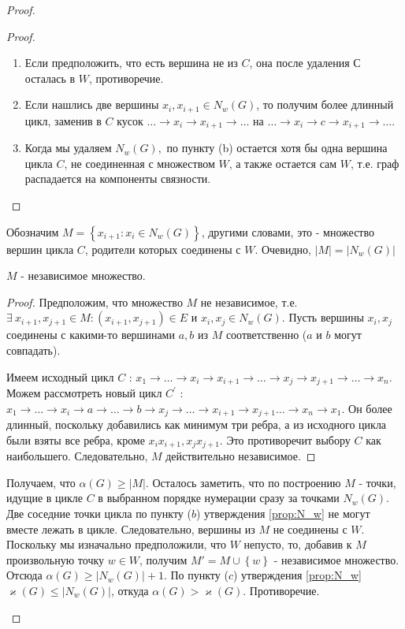 \begin{proof}
\begin{enumerate}
\begin{prop}
		\end{prop}
		
		\begin{proof}
			\:
			\begin{enumerate} \renewcommand{\theenumi}{\arabic{enumi}}
				\item Если предположить, что есть вершина не из $ C $, она после удаления $ С $ осталась в $ W $, противоречие.
				\item Если нашлись две вершины $ x_i, x_{i + 1} \in N_w(G) $, то получим более длинный цикл, заменив в $ C $ кусок $\dots \rightarrow x_i \rightarrow x_{i + 1} \rightarrow \dots$ на $ \dots \rightarrow x_i \rightarrow c \rightarrow x_{i + 1} \rightarrow \dots$.
				\item Когда мы удаляем $ N_w(G), $ по пункту (b) остается хотя бы одна вершина цикла $ C $, не соединенная с множеством $ W $, а также остается сам $ W $, т.е. граф распадается на компоненты связности.
			\end{enumerate}
		\end{proof}
		Обозначим $ M = \left\lbrace x_{i + 1} : x_i \in N_w(G)\right\rbrace $, другими словами, это - множество вершин цикла $ C $, родители которых соединены с $ W $. Очевидно, $ |M| = |N_w(G)| $
		\begin{prop}
			$ M $ - независимое множество.
		\end{prop}
		\begin{proof}
			Предположим, что множество $ M $ не независимое, т.е. $ \exists\: x_{i + 1}, x_{j + 1} \in M : (x_{i + 1}, x_{j + 1}) \in E $ и $ x_i, x_j \in N_w(G) $. Пусть вершины $ x_{i}, x_{j} $ соединены с какими-то вершинами $ a, b $ из $ M $ соответственно ($ a $ и $ b $ могут совпадать).
			
			
			Имеем исходный цикл $ C $ : $x_1 \rightarrow \dots \rightarrow x_i \rightarrow x_{i + 1} \rightarrow \dots \rightarrow x_j \rightarrow x_{j + 1} \rightarrow \dots \rightarrow x_n$. Можем рассмотреть новый цикл $ C^\prime $ :
			$x_1 \rightarrow \dots \rightarrow x_i \rightarrow a \rightarrow \dots \rightarrow b \rightarrow x_j \rightarrow \ldots \rightarrow x_{i + 1} \rightarrow x_{j + 1} \dots \rightarrow x_n \rightarrow x_1$. Он более длинный, поскольку добавились как минимум три ребра, а из исходного цикла были взяты все ребра, кроме $ x_ix_{i + 1}, x_jx_{j + 1} $. Это противоречит выбору $ C $ как наибольшего. Следовательно, $ M $ действительно независимое.
			
		\end{proof}
		Получаем, что $ \alpha(G) \geqslant |M|$. Осталось заметить, что по построению $ M $ - точки, идущие в цикле $ C $ в выбранном порядке нумерации сразу за точками $ N_w(G) $. Две соседние точки цикла по пункту ($ b $) утверждения \ref{prop:N_w} не могут вместе лежать в цикле. Следовательно, вершины из $ M $ не соединены с $ W $. Поскольку мы изначально предположили, что $ W $ непусто, то, добавив к $ M $ произвольную точку $ w \in W$, получим $ M' = M \cup \left\lbrace w\right\rbrace $ - независимое множество. Отсюда $ \alpha(G) \geqslant  |N_w(G)| + 1 $. По пункту ($ c $) утверждения \ref{prop:N_w} $ \varkappa(G) \leqslant |N_w(G)| $, откуда $ \alpha(G) > \varkappa(G) $. Противоречие.
			

\end{enumerate}
\end{proof}
